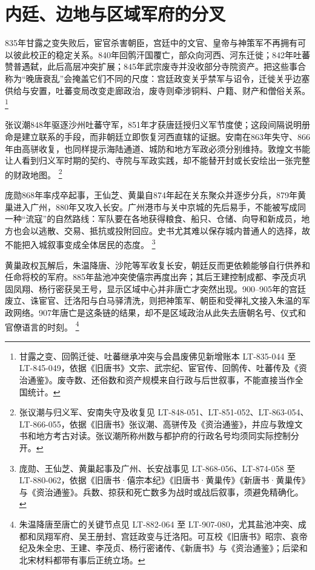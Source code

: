 \section{内廷、边地与区域军府的分叉}
\label{sec:late-tang-regional-fracture}

835年甘露之变失败后，宦官杀害朝臣，宫廷中的文官、皇帝与神策军不再拥有可以彼此校正的稳定关系。840年回鹘汗国覆亡，部众向河西、河东迁徙；842年吐蕃赞普遇弑，此后高层冲突扩展；845年武宗废寺并没收部分寺院资产。把这些事合称为“晚唐衰乱”会掩盖它们不同的尺度：宫廷政变关乎禁军与诏令，迁徙关乎边塞供给与安置，吐蕃变局改变走廊政治，废寺则牵涉铜料、户籍、财产和僧俗关系。%
\footnote{甘露之变、回鹘迁徙、吐蕃继承冲突与会昌废佛见新增账本 LT-835-044 至 LT-845-049，依据《旧唐书》文宗、武宗纪、宦官传、回鹘传、吐蕃传及《资治通鉴》。废寺数、还俗数和资产规模来自行政与后世叙事，不能直接当作全国统计。}

张议潮848年驱逐沙州吐蕃守军，851年才获唐廷授归义军节度使；这段间隔说明册命是建立联系的手段，而非朝廷立即恢复河西直辖的证据。安南在863年失守、866年由高骈收复，也同样提示海陆通道、城防和地方军政必须分别维持。敦煌文书能让人看到归义军时期的契约、寺院与军政实践，却不能替开封或长安绘出一张完整的财政地图。%
\footnote{张议潮与归义军、安南失守及收复见 LT-848-051、LT-851-052、LT-863-054、LT-866-055，依据《旧唐书》张议潮、高骈传及《资治通鉴》，并应与敦煌文书和地方考古对读。张议潮所称州数与都护府的行政名号均须同实际控制分开。}

庞勋868年率戍卒起事，王仙芝、黄巢自874年起在关东聚众并逐步分兵，879年黄巢进入广州，880年又攻入长安。广州港市与关中京城的先后易手，不能被写成同一种“流寇”的自然路线：军队要在各地获得粮食、船只、仓储、向导和新成员，地方也会以逃散、交易、抵抗或投附回应。史书尤其难以保存城内普通人的选择，故不能把入城叙事变成全体居民的态度。%
\footnote{庞勋、王仙芝、黄巢起事及广州、长安战事见 LT-868-056、LT-874-058 至 LT-880-062，依据《旧唐书·僖宗本纪》《旧唐书·黄巢传》《新唐书·黄巢传》与《资治通鉴》。兵数、掠获和死亡数多为战时或战后叙事，须避免精确化。}

黄巢政权瓦解后，朱温降唐、沙陀等军收复长安，朝廷反而更依赖能够自行供养和任命将校的军府。885年盐池冲突使僖宗再度出奔；其后王建控制成都、李茂贞巩固凤翔、杨行密获吴王号，显示区域中心并非唐亡才突然出现。900--905年的宫廷废立、诛宦官、迁洛阳与白马驿清洗，则把神策军、朝臣和受禅礼文接入朱温的军政网络。907年唐亡是这条链的结果，却不是区域政治从此失去唐朝名号、仪式和官僚语言的时刻。%
\footnote{朱温降唐至唐亡的关键节点见 LT-882-064 至 LT-907-080，尤其盐池冲突、成都和凤翔军府、吴王册封、宫廷政变与迁洛阳。可互校《旧唐书》昭宗、哀帝纪及朱全忠、王建、李茂贞、杨行密诸传、《新唐书》与《资治通鉴》；后梁和北宋材料都带有事后正统立场。}

